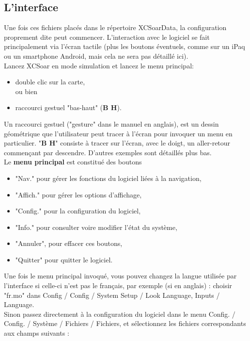 \documentclass{article}
\begin{document}
\subsection{L'interface}
\noindent
%
Une fois ces fichiers placés dans le répertoire XCSoarData, la configuration proprement dite peut commencer. L'interaction avec le logiciel se fait principalement via l'écran tactile (plus les boutons éventuels, comme sur un iPaq ou un smartphone Android, mais cela ne sera pas détaillé ici).\\
%
\newline
%
Lancez XCSoar en mode simulation et lancez le menu principal:
\begin{itemize}
\item double clic sur la carte,\\
ou bien
\item raccourci gestuel "bas-haut" (\textbf{B H}).
\end{itemize}
Un raccourci gestuel ("gesture" dans le manuel en anglais), est un dessin géométrique que l'utilisateur peut tracer à l'écran pour invoquer un menu en particulier. "\textbf{B H}" consiste à tracer sur l'écran, avec le doigt, un aller-retour commençant par descendre. D'autres exemples sont détaillés plus bas.\\
%
\newline
%
Le \textbf{menu principal} est constitué des boutons
\begin{itemize}
\item "Nav." pour gérer les fonctions du logiciel liées à la navigation,
\item "Affich." pour gérer les options d'affichage,
\item "Config." pour la configuration du logiciel,
\item "Info." pour consulter voire modifier l'état du système,
\item "Annuler", pour effacer ces boutons,
\item "Quitter" pour quitter le logiciel.
\end{itemize}
%
Une fois le menu principal invoqué, vous pouvez changez la langue utilisée par l'interface si celle-ci n'est pas le français, par exemple (si en anglais) : choisir "fr.mo" dans Config / Config / System Setup / Look Language, Inputs / Language.\\
%
\newline
%
Sinon passez directement à la configuration du logiciel dans le menu Config. / Config. / Système / Fichiers / Fichiers, et sélectionnez les fichiers correspondants aux champs suivants :
\end{document}
